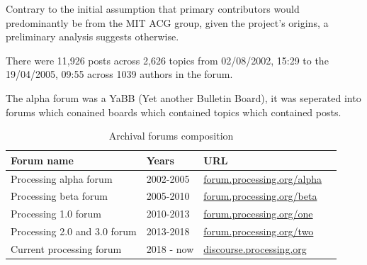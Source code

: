 

Contrary to the initial assumption that primary contributors would predominantly be from the MIT ACG group, given the project's origins, a preliminary analysis suggests otherwise.

%
%
%
%

There were 11,926 posts across 2,626 topics from 02/08/2002, 15:29 to the 19/04/2005, 09:55 across 1039 authors in the forum.

The alpha forum was a YaBB (Yet another Bulletin Board), it was seperated into forums which conained boards which contained topics which contained posts.




\begin{table}[h]
	\raggedright
	\begin{adjustbox}{center}
		\begin{tabular}{l l l c}
			\toprule
			Forum name                   & Years      & URL                                                                    \\
			\midrule
			Processing alpha forum       & 2002-2005  & \href{https://forum.processing.org/alpha/}{forum.processing.org/alpha} \\
			Processing beta forum        & 2005-2010  & \href{https://forum.processing.org/beta/}{forum.processing.org/beta}   \\
			Processing 1.0 forum         & 2010-2013  & \href{https://forum.processing.org/one/}{forum.processing.org/one}     \\
			Processing 2.0 and 3.0 forum & 2013-2018  & \href{https://forum.processing.org/two/}{forum.processing.org/two}     \\
			Current processing forum     & 2018 - now & \href{https://discourse.processing.org/}{discourse.processing.org}     \\
			\bottomrule
		\end{tabular}
	\end{adjustbox}
	\caption{Archival forums composition}
	\label{table:forums}
\end{table}

